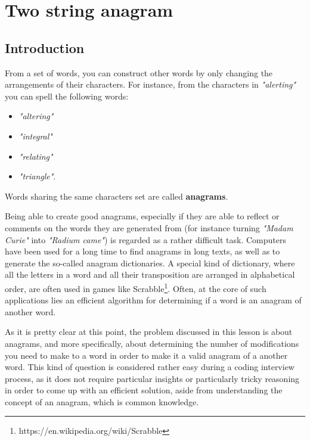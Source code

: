 %


\chapter{Two string anagram}
\label{ch:two_string_anagram}
\section*{Introduction}
From a set of words, you can construct other words by only changing the arrangements of their characters.
For instance, from the characters in \textit{"alerting"} you can spell the following words:
\begin{itemize}
	\item  \textit{"altering"}
	\item  \textit{"integral"}
	\item  \textit{"relating"}
	\item  \textit{"triangle"}.
\end{itemize}
Words sharing the same characters set are called \textbf{anagrams}. 

Being able to create good anagrams, especially if they are able to reflect or comments on the words they are generated from (for instance turning
\textit{"Madam Curie"} into \textit{"Radium came"}) is regarded as a rather difficult task.
Computers have been used for a long time to find anagrams in long texts, as well as to generate the so-called anagram dictionaries.  A special kind of dictionary, where all the letters in a word and
all their transposition are arranged in alphabetical order,  are often used in games like
Scrabble\footnote{https://en.wikipedia.org/wiki/Scrabble}. Often, at the core of such applications lies an efficient algorithm for determining if a word is an anagram of another word.

As it is pretty clear at this point, the problem discussed in this lesson is about anagrams, and more specifically, about determining the number of
modifications you need to make to a word in order to make it a valid anagram of a
another word.
This kind of question is considered rather easy during a coding interview process, as it does not require particular insights or particularly tricky reasoning in order to come up with an efficient solution, aside from understanding the concept of an anagram, which is common knowledge.

